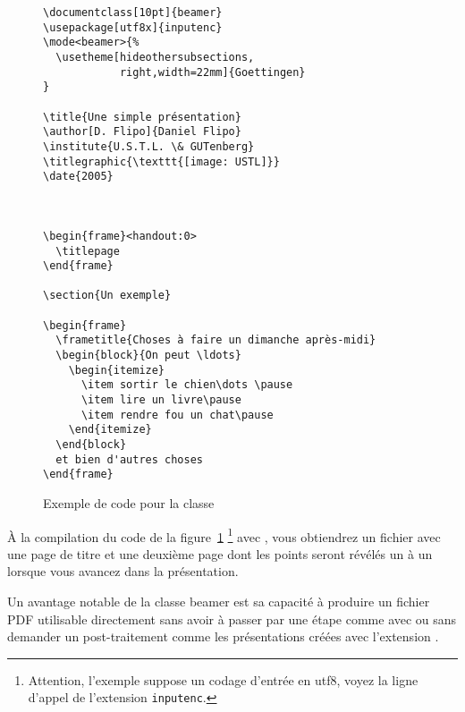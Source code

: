 \begin{figure}[htbp]
\begin{verbatim}
\documentclass[10pt]{beamer}
\usepackage[utf8x]{inputenc}
\mode<beamer>{%
  \usetheme[hideothersubsections,
            right,width=22mm]{Goettingen}
}

\title{Une simple présentation}
\author[D. Flipo]{Daniel Flipo}
\institute{U.S.T.L. \& GUTenberg}
\titlegraphic{\texttt{[image: USTL]}}
\date{2005}



\begin{frame}<handout:0>
  \titlepage
\end{frame}

\section{Un exemple}

\begin{frame}
  \frametitle{Choses à faire un dimanche après-midi}
  \begin{block}{On peut \ldots}
    \begin{itemize}
      \item sortir le chien\dots \pause
      \item lire un livre\pause
      \item rendre fou un chat\pause
    \end{itemize}
  \end{block}
  et bien d'autres choses
\end{frame}

\end{verbatim}
  \caption{Exemple de code pour la classe }
  \label{fig:code-beamer}
\end{figure}

À la compilation du code de la figure~\ref{fig:code-beamer}
\footnote{Attention, l'exemple suppose un codage d'entrée en
  utf8, voyez la ligne d'appel de l'extension \texttt{inputenc}. \NdT}
avec , vous obtiendrez un fichier avec une page de titre
et une deuxième page dont les points seront révélés un à un lorsque
vous avancez dans la présentation.

Un avantage notable de la classe beamer est sa capacité à produire un
fichier PDF utilisable directement sans avoir à passer par une étape
\PSi{} comme avec  ou sans demander un post-traitement
comme les présentations créées avec l'extension .

